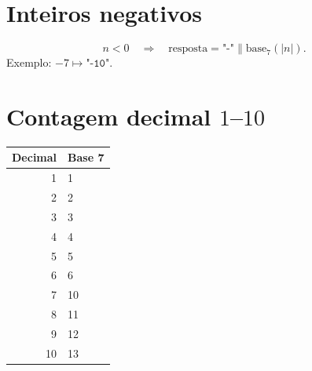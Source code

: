 \documentclass[11pt]{article}
\begin{document}
\section{Inteiros negativos}

\[
  n < 0 \quad \Rightarrow \quad \text{resposta} = \texttt{"-"} \mathbin{\|} \text{base}_7(|n|).
\]
Exemplo: $-7 \mapsto \texttt{"-10"}$.

\section{Contagem decimal $1$--$10$}

\begin{center}
\begin{tabular}{r|l}
  Decimal & Base 7 \\ \hline
  1  & 1 \\
  2  & 2 \\
  3  & 3 \\
  4  & 4 \\
  5  & 5 \\
  6  & 6 \\
  7  & 10 \\
  8  & 11 \\
  9  & 12 \\
  10 & 13 \\
\end{tabular}
\end{center}
\end{document}
